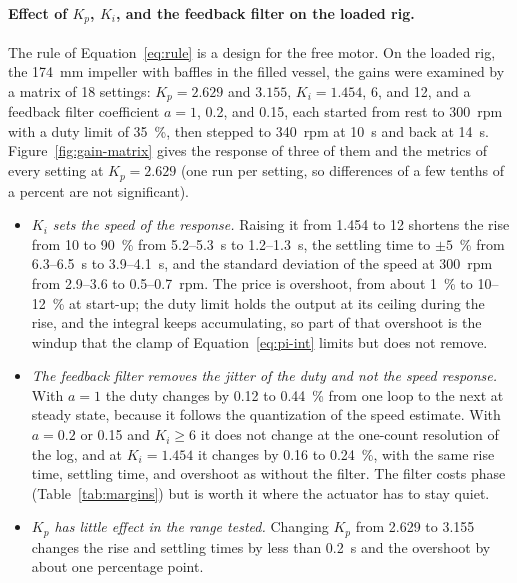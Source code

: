 \paragraph{Effect of $K_p$, $K_i$, and the feedback filter on the loaded rig.}
The rule of Equation~\ref{eq:rule} is a design for the free motor. On the loaded rig, the 174~mm impeller with baffles in the filled vessel, the gains were examined by a matrix of 18 settings: $K_p = 2.629$ and $3.155$, $K_i = 1.454$, 6, and 12, and a feedback filter coefficient $a = 1$, 0.2, and 0.15, each started from rest to 300~rpm with a duty limit of 35~\%, then stepped to 340~rpm at 10~s and back at 14~s. Figure~\ref{fig:gain-matrix} gives the response of three of them and the metrics of every setting at $K_p = 2.629$ (one run per setting, so differences of a few tenths of a percent are not significant).
\begin{itemize}
    \item \emph{$K_i$ sets the speed of the response.} Raising it from 1.454 to 12 shortens the rise from 10 to 90~\% from 5.2--5.3~s to 1.2--1.3~s, the settling time to $\pm 5$~\% from 6.3--6.5~s to 3.9--4.1~s, and the standard deviation of the speed at 300~rpm from 2.9--3.6 to 0.5--0.7~rpm. The price is overshoot, from about 1~\% to 10--12~\% at start-up; the duty limit holds the output at its ceiling during the rise, and the integral keeps accumulating, so part of that overshoot is the windup that the clamp of Equation~\ref{eq:pi-int} limits but does not remove.
    \item \emph{The feedback filter removes the jitter of the duty and not the speed response.} With $a = 1$ the duty changes by 0.12 to 0.44~\% from one loop to the next at steady state, because it follows the quantization of the speed estimate. With $a = 0.2$ or 0.15 and $K_i \geq 6$ it does not change at the one-count resolution of the log, and at $K_i = 1.454$ it changes by 0.16 to 0.24~\%, with the same rise time, settling time, and overshoot as without the filter. The filter costs phase (Table~\ref{tab:margins}) but is worth it where the actuator has to stay quiet.
    \item \emph{$K_p$ has little effect in the range tested.} Changing $K_p$ from 2.629 to 3.155 changes the rise and settling times by less than 0.2~s and the overshoot by about one percentage point.
\end{itemize}

